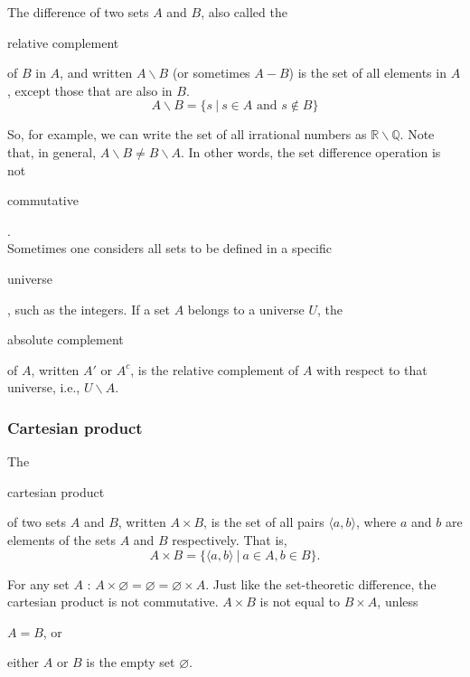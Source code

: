\documentclass[11pt]{article}
\theoremstyle{plain}
\theoremstyle{definition}
\newenvironment{packed_items}{
\begin{itemize}
  \setlength{\itemsep}{1pt}
  \setlength{\parskip}{0pt}
  \setlength{\parsep}{0pt}
}{\end{itemize}}
\begin{document}
\begin{center}
  \def\svgwidth{0.3\columnwidth}
  
\end{center}

\noindent The difference of two sets $ A $ and $ B $, also called the \begin{em}relative complement\end{em} of $ B $ in $ A $, and written $ A \backslash B $ (or sometimes $ A - B $) is the set of all elements in $ A $, except those that are also in $ B $.
$$
A \backslash B = \{ s \ | \ s \in A \text{ and } s \notin B \} 
$$

\noindent So, for example, we can write the set of all irrational numbers as $ \mathbb{R} \backslash \mathbb{Q} $. Note that, in general, $ A \backslash B \ne B \backslash A $. In other words, the set difference operation is not \begin{em}commutative\end{em}.  \\
  
\noindent Sometimes one considers all sets to be defined in a specific \begin{em}universe\end{em}, such as the integers. If a set $ A $ belongs to a universe $ U $, the \begin{em}absolute complement\end{em} of $ A $, written $ A' $ or $ A^c $, is the relative complement of $ A $ with respect to that universe, i.e., $ U \backslash A $. \\

\begin{center}
  \def\svgwidth{0.3\columnwidth}
  
\end{center}

\subsubsection*{Cartesian product}

The \begin{em}cartesian product\end{em} of two sets $ A $ and $ B $, written $ A \times B $, is the set of all pairs $ \langle a, b \rangle $, where $ a $ and $ b $ are elements of the sets $ A $ and $ B $ respectively. That is,
$$
A \times B = \{ \langle a, b \rangle \ | \ a \in A, b \in B \}.
$$

\noindent For any set $ A $ : $ A \times \varnothing = \varnothing = \varnothing \times A $. Just like the set-theoretic difference, the cartesian product is not commutative. $ A \times B $ is not equal to $ B \times A $, unless 
\begin{packed_items}
\item $ A = B $, or 
\item either $ A $ or $ B $ is the empty set $ \varnothing $. 
\end{packed_items}
\end{document}
